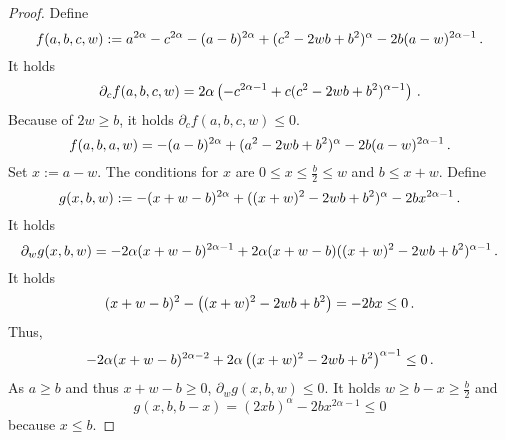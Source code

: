 \begin{proof}
	Define
	\begin{equation*}
		f(a,b,c,w) := a^{2\alpha}-c^{2\alpha}-(a-b)^{2\alpha}+(c^2 - 2 w b + b^2)^\alpha 
			- 2 b (a-w)^{2\alpha-1}
			\, .
	\end{equation*} 
	It holds
	\begin{equation*}
		\partial_c f(a,b,c,w) =2\alpha\left( -c^{2\alpha-1}+c(c^2 - 2 w b + b^2)^{\alpha-1} \right)
		\, .
	\end{equation*} 
	Because of $2w \geq b$, it holds $\partial_c f(a,b,c,w) \leq 0$.
	\begin{equation*}
		f(a,b,a,w) = -(a-b)^{2\alpha}+(a^2 - 2 w b + b^2)^\alpha - 2 b (a-w)^{2\alpha-1}
		\, .
	\end{equation*}
	Set $x := a-w$.
	The conditions for $x$ are $0 \leq x \leq \frac b2 \leq w$ and $b \leq x+w$. Define
	\begin{equation*}
		g(x,b,w) := -(x+w-b)^{2\alpha}+((x+w)^2 - 2 w b + b^2)^\alpha - 2 b x^{2\alpha-1}
		\, .
	\end{equation*}
	It holds
	\begin{equation*}
		\partial_w g(x,b,w) =-2\alpha(x+w-b)^{2\alpha-1}+2\alpha(x+w-b)((x+w)^2 - 2 w b + b^2)^{\alpha-1} 
		\, .
	\end{equation*}
	It holds
	\begin{equation*}
		(x+w-b)^2 - \left( (x+w)^2 - 2 w b + b^2 \right) = -2 b x \leq 0
		\, .
	\end{equation*}
	Thus,
	\begin{equation*}
		-2\alpha(x+w-b)^{2\alpha-2} + 2\alpha\left( (x+w)^2 - 2 w b + b^2 \right)^{\alpha-1} \leq 0
		\, .
	\end{equation*}
	As $a \geq b$ and thus $x+w-b \geq 0$, $\partial_w g(x,b,w) \leq 0$.
	It holds $w \geq b-x \geq \frac b2$ and 
	\begin{equation*}
		g(x,b,b-x)
		=
		(2 x b)^\alpha - 2 b x^{2\alpha-1}
		\leq 0
	\end{equation*}
	because $x\leq b$.
\end{proof}
%
%
%
%
